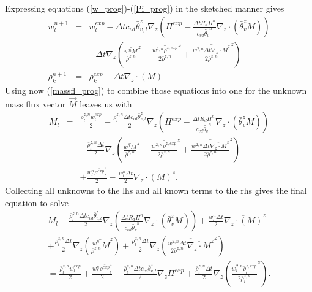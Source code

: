 \documentclass[a4paper,10pt]{article}
\begin{document}
Expressing equations (\ref{w_prog})-(\ref{Pi_prog}) in the sketched manner gives
\begin{eqnarray*}
w^{n+1}_l&=&w^{exp}_l-\Delta t c_{vd}\bar\theta^z_{v,l}\nabla_z\left( \Pi^{exp}-\frac{\Delta t R_d \Pi^n}{c_{vd}\widetilde{\theta_v}^n}\nabla_z\cdot(\bar\theta^z_vM)\right)\\
&&-\Delta t \nabla_z \left(
\overline{\frac{w^nM}{\bar\rho^{z,n}}}^z-\overline{\frac{w^{2,n}\bar\rho^{z,exp}}{2\bar\rho^{z,n}}}^z
+\overline{\frac{w^{2,n}\Delta t \overline{\nabla_z \cdot M}^z}{2\bar\rho^{z,n}}}^z\right)\\
\rho^{n+1}_k&=&\rho^{exp}_k-\Delta t \nabla_z \cdot (M)
\end{eqnarray*}
Using now (\ref{massfl_prog}) to combine those equations into one for the unknown mass flux vector $\vec{M}$ leaves us with
\begin{eqnarray*}
 M_l &=&
\frac{\bar{\rho}^{z,n}_lw^{exp}_l}{2}
-\frac{\bar{\rho}^{z,n}_l\Delta t c_{vd}\bar\theta^z_{v,l}}{2}\nabla_z\left( \Pi^{exp}-\frac{\Delta t R_d \Pi^n}{c_{vd}\widetilde{\theta_v}^n}\nabla_z\cdot(\bar\theta^z_vM)\right)\nonumber\\
&&
-\frac{\bar{\rho}^{z,n}_l\Delta t}{2} \nabla_z \left(
\overline{\frac{w^nM}{\bar\rho^{z,n}}}^z-\overline{\frac{w^{2,n}\bar\rho^{z,exp}}{2\bar\rho^{z,n}}}^z
+\overline{\frac{w^{2,n}\Delta t \overline{\nabla_z \cdot M}^z}{2\bar\rho^{z,n}}}^z\right)\nonumber\\
&&+\frac{w^n_l\overline{\rho^{exp}}^z_l}{2}-\frac{w^n_l\Delta t}{2}\overline{\nabla_z \cdot (M)}^z.
\end{eqnarray*}
Collecting all unknowns to the lhs and all known terms to the rhs gives the final equation to solve
\begin{gather}
 M_l
-\frac{\bar{\rho}^{z,n}_l\Delta t c_{vd}\bar\theta^z_{v,l}}{2}\nabla_z\left(\frac{\Delta t R_d\Pi^n}{c_{vd}\widetilde{\theta_v}^n}\nabla_z\cdot(\bar\theta^z_vM)\right)
+\frac{w^n_l\Delta t}{2}\overline{\nabla_z \cdot (M)}^z\nonumber\\
+\frac{\bar{\rho}^{z,n}_l\Delta t}{2} \nabla_z \left(\overline{\frac{w^n}{\bar\rho^{z,n}}M}^z\right)
+\frac{\bar{\rho}^{z,n}_l\Delta t}{2} \nabla_z \left(\overline{\frac{w^{2,n}\Delta t}{2\bar\rho^{z,n}}\overline{\nabla_z\cdot M}^z}^z\right)\nonumber\\
=
\frac{\bar{\rho}^{z,n}_lw^{exp}_l}{2}+\frac{w^n_l\overline{\rho^{exp}}^z_l}{2}
-\frac{\bar{\rho}^{z,n}_l\Delta t c_{vd}\bar\theta^z_{v,l}}{2}\nabla_z \Pi^{exp}
+\frac{\bar{\rho}^{z,n}_l\Delta t}{2} \nabla_z \left(
\overline{\frac{w^{2,n}_l\bar\rho^{z,exp}_l}{2\bar\rho^{z,n}_l}}^z\right)
.\label{matrix1}
\end{gather}
\end{document}
